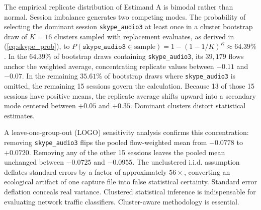 \documentclass[conference]{IEEEtran}
\begin{document}
The empirical replicate distribution of Estimand A is bimodal rather than normal. Session imbalance generates two competing modes. The probability of selecting the dominant session \texttt{skype\_audio3} at least once in a cluster bootstrap draw of $K = 16$ clusters sampled with replacement evaluates, as derived in (\ref{eq:skype_prob}), to $P(\texttt{skype\_audio3} \in \text{sample}) = 1 - (1 - 1/K)^K \approx 64.39\%$.
In the $64.39\%$ of bootstrap draws containing \texttt{skype\_audio3}, its $39,179$ flows anchor the weighted average, concentrating replicate values between $-0.11$ and $-0.07$. In the remaining $35.61\%$ of bootstrap draws where \texttt{skype\_audio3} is omitted, the remaining 15 sessions govern the calculation. Because 13 of those 15 sessions have positive means, the replicate average shifts upward into a secondary mode centered between $+0.05$ and $+0.35$. Dominant clusters distort statistical estimates.

A leave-one-group-out (LOGO) sensitivity analysis confirms this concentration: removing \texttt{skype\_audio3} flips the pooled flow-weighted mean from $-0.0778$ to $+0.0720$. Removing any of the other 15 sessions leaves the pooled mean unchanged between $-0.0725$ and $-0.0955$. The unclustered i.i.d. assumption deflates standard errors by a factor of approximately $56\times$, converting an ecological artifact of one capture file into false statistical certainty. Standard error deflation conceals real variance. Clustered statistical inference is indispensable for evaluating network traffic classifiers. Cluster-aware methodology is essential.
\end{document}
